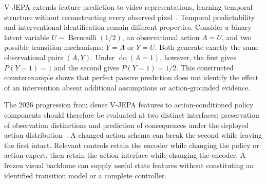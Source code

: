V-JEPA extends feature prediction to video representations, learning temporal structure without reconstructing every observed pixel~\cite{bardes2024vjepa}. Temporal predictability and interventional identification remain different properties. Consider a binary latent variable $U\sim\operatorname{Bernoulli}(1/2)$, an observational action $A=U$, and two possible transition mechanisms: $Y=A$ or $Y=U$. Both generate exactly the same observational pairs $(A,Y)$. Under $\operatorname{do}(A=1)$, however, the first gives $P(Y=1)=1$ and the second gives $P(Y=1)=1/2$. This constructed counterexample shows that perfect passive prediction does not identify the effect of an intervention absent additional assumptions or action-grounded evidence.

The 2026 progression from dense V-JEPA features to action-conditioned policy components should therefore be evaluated at two distinct interfaces: preservation of observation distinctions and prediction of consequences under the deployed action distribution~\cite{rewrite_vjepa21,rewrite_vjepapolicy2026}. A changed action schema can break the second while leaving the first intact. Relevant controls retain the encoder while changing the policy or action expert, then retain the action interface while changing the encoder. A frozen visual backbone can supply useful state features without constituting an identified transition model or a complete controller.

